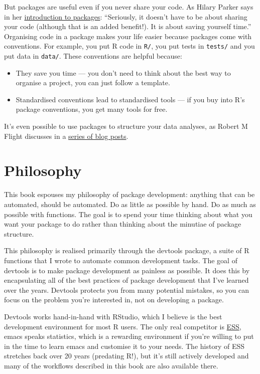 \documentclass[]{book}
\begin{document}
But packages are useful even if you never share your code. As Hilary Parker says in her \href{http://hilaryparker.com/2014/04/29/writing-an-r-package-from-scratch/}{introduction to packages}: ``Seriously, it doesn't have to be about sharing your code (although that is an added benefit!). It is about saving yourself time.'' Organising code in a package makes your life easier because packages come with conventions. For example, you put R code in \texttt{R/}, you put tests in \texttt{tests/} and you put data in \texttt{data/}. These conventions are helpful because:

\begin{itemize}
\item
  They save you time --- you don't need to think about the best way to organise
  a project, you can just follow a template.
\item
  Standardised conventions lead to standardised tools --- if you buy into
  R's package conventions, you get many tools for free.
\end{itemize}

It's even possible to use packages to structure your data analyses, as Robert M Flight discusses in a \href{http://rmflight.github.io/posts/2014/07/analyses_as_packages.html}{series of blog posts}.

\hypertarget{intro-phil}{%
\section{Philosophy}\label{intro-phil}}

This book espouses my philosophy of package development: anything that can be automated, should be automated. Do as little as possible by hand. Do as much as possible with functions. The goal is to spend your time thinking about what you want your package to do rather than thinking about the minutiae of package structure.

This philosophy is realised primarily through the devtools package, a suite of R functions that I wrote to automate common development tasks. The goal of devtools is to make package development as painless as possible. It does this by encapsulating all of the best practices of package development that I've learned over the years. Devtools protects you from many potential mistakes, so you can focus on the problem you're interested in, not on developing a package.

Devtools works hand-in-hand with RStudio, which I believe is the best development environment for most R users. The only real competitor is \href{http://ess.r-project.org/}{ESS}, emacs speaks statistics, which is a rewarding environment if you're willing to put in the time to learn emacs and customise it to your needs. The history of ESS stretches back over 20 years (predating R!), but it's still actively developed and many of the workflows described in this book are also available there.
\end{document}
